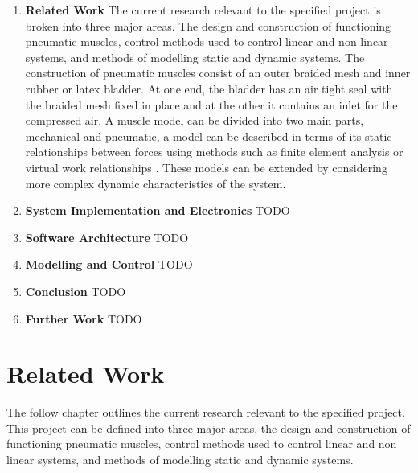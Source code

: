 \documentclass[11pt,a4paper]{article}
\begin{document}
\begin{enumerate}
\item \textbf{Related Work} The current research relevant to the specified project is broken into three major areas. The design and construction of functioning pneumatic muscles, control methods used to control linear and non linear systems, and methods of modelling static and dynamic systems. The construction of pneumatic muscles consist of an outer braided mesh and inner rubber or latex bladder. At one end, the bladder has an air tight seal with the braided mesh fixed in place and at the other it contains an inlet for the compressed air. A muscle model can be divided into two main parts, mechanical and pneumatic, a model can be described in terms of its static relationships between forces using methods such as finite element analysis or virtual work relationships . These models can be extended by considering more complex dynamic characteristics of the system.

\item \textbf{System Implementation and Electronics}
TODO
\clearpage %
\item \textbf{Software Architecture}
TODO

\item \textbf{Modelling and Control}
TODO

\item \textbf{Conclusion} 
TODO
\clearpage %

\item \textbf{Further Work}
TODO
\end{enumerate}

\clearpage
\section{Related Work}
\label{sec:related_work}

The follow chapter outlines the current research relevant to the specified project. This project can be defined into three major areas, the design and construction of functioning pneumatic muscles, control methods used to control linear and non linear systems, and methods of modelling static and dynamic systems. 
\end{document}
